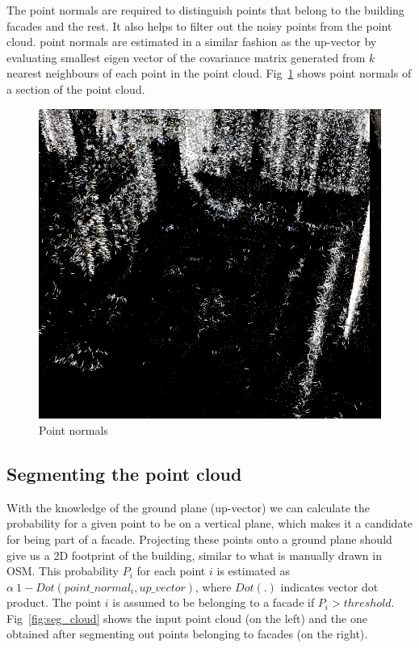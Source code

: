 \documentclass[10pt,twocolumn,letterpaper]{article}
\begin{document}
The point normals are required to distinguish points that belong to the building facades and the rest. It also helps to filter out the noisy points from the point cloud. point normals are estimated in a similar fashion as the up-vector by evaluating smallest eigen vector of the covariance matrix generated from $\textit{k}$ nearest neighbours of each point in the point cloud. Fig~\ref{fig:normals} shows point normals of a section of the point cloud.

\begin{figure}[h]
   \centering
   \includegraphics[width=\linewidth]{images/point_normals.png}
   \caption{Point normals}
   \label{fig:normals}
\end{figure}

\subsection{Segmenting the point cloud}
With the knowledge of the ground plane (up-vector) we can calculate the probability for a given point to be on a vertical plane, which makes it a candidate for being part of a facade. Projecting these points onto a ground plane should give us a 2D footprint of the building, similar to what is manually drawn in OSM. This probability $P_{i}$ for each point $i$ is estimated as $\alpha \ 1 - \textit{Dot}(point\_normal_i, up\_vector)$, where $\textit{Dot}(.)$ indicates vector dot product. The point $i$ is assumed to be belonging to a facade if $P_{i} > threshold$. Fig~\ref{fig:seg_cloud} shows the input point cloud (on the left) and the one obtained after segmenting out points belonging to facades (on the right).
\end{document}
